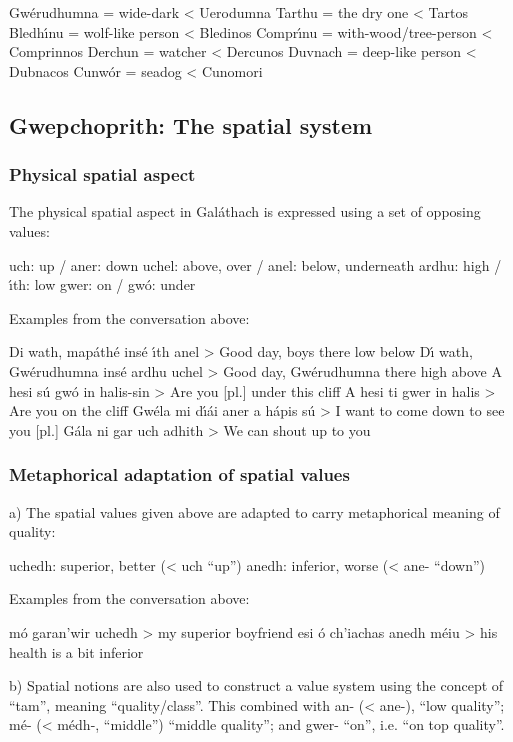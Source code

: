 Gw\'{e}rudhumna = wide-dark < Uerodumna
Tarthu = the dry one < Tartos
Bledh\'{\i}nu = wolf-like person < Bledinos
Compr\'{\i}nu = with-wood/tree-person < Comprinnos
Derchun = watcher < Dercunos
Duvnach = deep-like person < Dubnacos
Cunw\'{o}r = seadog < Cunomori


\subsection{Gwepchoprith: The spatial system}
\subsubsection{Physical spatial aspect}

The physical spatial aspect in Gal\'{a}thach is expressed using a set of opposing values:

        uch: up                     / aner: down
        uchel: above, over    / anel: below, underneath
        ardhu: high              / \'{\i}th: low
        gwer: on                    / gw\'{o}: under

Examples from the conversation above:

Di wath, map\'{a}th\'{e} ins\'{e} \'{\i}th anel > Good day, boys there low below
D\'{\i} wath, Gw\'{e}rudhumna ins\'{e} ardhu uchel > Good day, Gw\'{e}rudhumna there high above 
A hesi s\'{u} gw\'{o} in halis-sin > Are you [pl.] under this cliff
A hesi ti gwer in halis > Are you on the cliff
Gw\'{e}la mi d\'{\i}\'{a}i aner a h\'{a}pis s\'{u} > I want to come down to see you [pl.]
G\'{a}la ni gar uch adhith > We can shout up to you


\subsubsection{Metaphorical adaptation of spatial values}

a) The spatial values given above are adapted to carry metaphorical meaning of quality:

        uchedh: superior, better (< uch “up”)
         anedh: inferior, worse (< ane- “down”)

Examples from the conversation above:

m\'{o} garan’wir uchedh > my superior boyfriend
esi \'{o} ch’iachas anedh m\'{e}iu > his health is a bit inferior

b) Spatial notions are also used to construct a value system using the concept of “tam”, meaning “quality/class”. This combined with an- (< ane-), “low quality”; m\'{e}- (< m\'{e}dh-, “middle”) “middle quality”; and gwer- “on”, i.e. “on top quality”.

